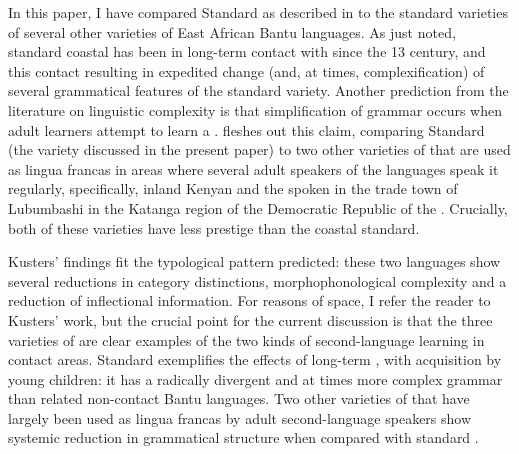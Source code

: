 \documentclass[output=paper,
modfonts
]{langscibook}
\begin{document}
In this paper, I have compared Standard  as described in \citet{Ashton1966} to the standard varieties of several other varieties of East African Bantu languages.  As just noted, standard coastal  has been in long-term contact with  since the 13 century, and this contact resulting in expedited change (and, at times, complexification) of several grammatical features of the standard variety. Another prediction from the literature on linguistic complexity is that simplification of grammar occurs when adult learners attempt to learn a . \citet{Kusters2003phd} fleshes out this claim, comparing Standard  (the variety discussed in the present paper) to two other varieties of  that are used as lingua francas in areas where several adult speakers of the languages speak it regularly, specifically, inland Kenyan  and the  spoken in the trade town of Lubumbashi in the Katanga region of the Democratic Republic of the . Crucially, both of these varieties have less prestige than the coastal standard.

Kusters' findings fit the typological pattern predicted: these two  languages show several reductions in category distinctions, morphophonological complexity and a reduction of inflectional information. For reasons of space, I refer the reader to Kusters' work, but the crucial point for the current discussion is that the three varieties of  are clear examples of the two kinds of second-language learning in contact areas. Standard  exemplifies the effects of long-term , with acquisition by young children: it has a radically divergent and at times more complex grammar than related non-contact Bantu languages.  Two other varieties of  that have largely been used as lingua francas by adult second-language speakers show systemic reduction in grammatical structure when compared with standard  \citep{Kusters2003phd}.




\end{document}
